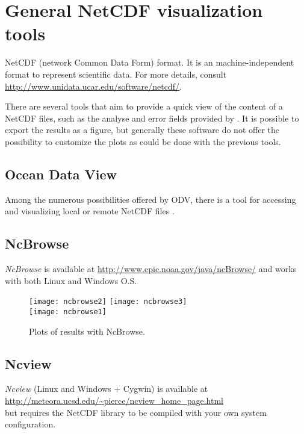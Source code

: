 \section[NetCDF visualization tools]{General NetCDF visualization tools}

NetCDF (network Common Data Form) format. It is an machine-independent format to represent scientific data. For more details, consult \url{http://www.unidata.ucar.edu/software/netcdf/}. 

There are several tools that aim to provide a quick view of the content of a NetCDF files, such as the analyse and error fields provided by \diva. It is possible to export the results as a figure, but generally these software do not offer the possibility to customize the plots as could be done with the previous tools.

\subsection{Ocean Data View}

Among the numerous possibilities offered by ODV, there is a tool for accessing and visualizing local or remote NetCDF files \citep[][Chapter~13]{SCHLITZER12}.



\subsection{NcBrowse}

\textsl{NcBrowse} is available at \url{http://www.epic.noaa.gov/java/ncBrowse/} and works with both Linux and Windows O.S.

\begin{figure}[htpb]
\centering
\texttt{[image: ncbrowse2]}\hspace{.5cm} \texttt{[image: ncbrowse3]} \\
\vspace{.5cm}
\texttt{[image: ncbrowse1]} 
\caption{Plots of results with NcBrowse.}
\end{figure}

\subsection{Ncview}

\textsl{Ncview} (Linux and Windows + Cygwin) is available at\\
\url{http://meteora.ucsd.edu/~pierce/ncview_home_page.html}\\
but requires the NetCDF library to be compiled with your own system configuration.

